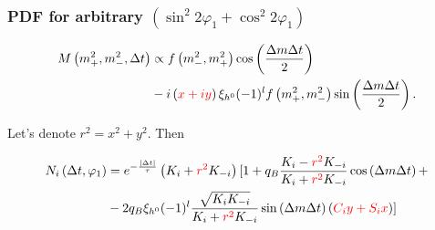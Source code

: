 \documentclass[10 pt,compress,mathserif]{beamer}
\newcommand{\cosbetasq}{\ensuremath{\cos^2{2\varphi_1}}\xspace}
\newcommand{\sinbetasq}{\ensuremath{\sin^2{2\varphi_1}}\xspace}
\begin{document}
\begin{frame}
 \frametitle{PDF for arbitrary $\left(\sinbetasq+\cosbetasq\right)$}
 \begin{equation*}
 \begin{split}
  M\left(m_+^2,m_-^2,\Delta t\right) &\propto f\left(m_-^2,m_+^2\right)\cos\left(\frac{\Delta m\Delta t}{2}\right)\\
  &-i\left(\textcolor{red}{x+iy}\right)\xi_{h^0}(-1)^l f\left(m_+^2,m_-^2\right)\sin\left(\frac{\Delta m\Delta t}{2}\right).
 \end{split}
 \end{equation*}

 Let's denote $r^2=x^2+y^2$. Then
 
 \begin{equation*}
 \begin{split}
  N_i\left(\Delta t,\varphi_1\right) &= e^{-\frac{\left|\Delta t\right|}{\tau}}\left(K_{i}+\textcolor{red}{r^2}K_{-i}\right)[ 1 + q_{B}\frac{K_{i}-\textcolor{red}{r^2}K_{-i}}{K_{i}+\textcolor{red}{r^2}K_{-i}}\cos\left(\Delta m\Delta t\right)+\\
  &-2q_{B}\xi_{h^0}(-1)^l\frac{\sqrt{K_iK_{-i}}}{K_{i}+\textcolor{red}{r^2}K_{-i}}\sin\left(\Delta m\Delta t\right)\left(\textcolor{red}{C_iy+S_ix}\right)]
 \end{split}
 \end{equation*}
\end{frame}
\end{document}
